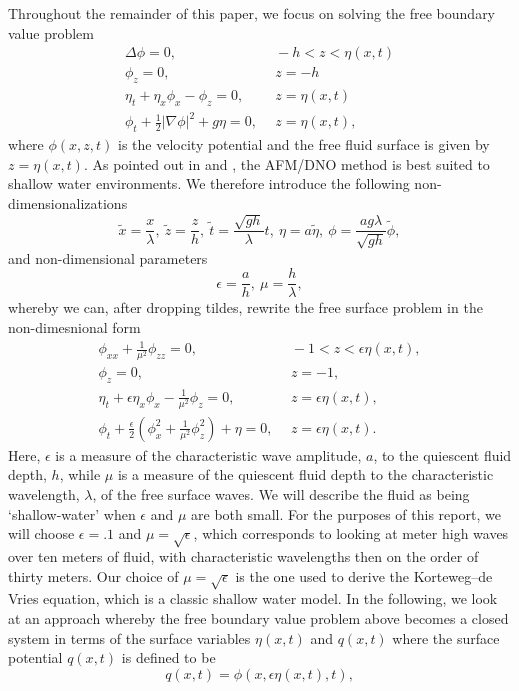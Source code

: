 
Throughout the remainder of this paper, we focus on solving the free boundary value problem 
\begin{align*}
\Delta \phi = 0, & ~~ -h < z < \eta(x,t) \\ 
\phi_{z} = 0, & ~~ z=-h\\
\eta_{t} + \eta_{x}\phi_{x}-\phi_{z} = 0, & ~~ z = \eta(x,t) \\ 
\phi_{t} + \frac{1}{2}\left|\nabla \phi \right|^{2} + g\eta = 0, & ~~ z=\eta(x,t),
\end{align*}
where $\phi(x,z,t)$ is the velocity potential and the free fluid surface is given by $z=\eta(x,t)$.  As pointed out in \cite{yue} and \cite{wilkening}, the AFM/DNO method is best suited to shallow water environments.  We therefore introduce the following non-dimensionalizations
\[
\tilde{x} = \frac{x}{\lambda}, ~ \tilde{z} = \frac{z}{h}, ~ \tilde{t} = \frac{\sqrt{gh}}{\lambda} t , ~ \eta = a \tilde{\eta}, ~ \phi = \frac{ag\lambda}{\sqrt{gh}}\tilde{\phi}, 
\]
and non-dimensional parameters
\[
\epsilon = \frac{a}{h}, ~ \mu = \frac{h}{\lambda}, 
\]
whereby we can, after dropping tildes, rewrite the free surface problem in the non-dimesnional form
\begin{align*}
\phi_{xx} + \frac{1}{\mu^{2} }\phi_{zz} = 0, & ~~ -1 < z < \epsilon\eta(x,t), \\ 
\phi_{z} = 0, & ~~ z=-1,\\
\eta_{t} + \epsilon\eta_{x}\phi_{x}-\frac{1}{\mu^{2}}\phi_{z} = 0, & ~~ z = \epsilon\eta(x,t), \\ 
\phi_{t} + \frac{\epsilon}{2}\left(\phi_{x}^{2} + \frac{1}{\mu^{2}}\phi_{z}^{2}\right) + \eta = 0, & ~~ z=\epsilon\eta(x,t).
\end{align*}
Here, $\epsilon$ is a measure of the characteristic wave amplitude, $a$, to the quiescent fluid depth, $h$, while $\mu$ is a measure of the quiescent fluid depth to the characteristic wavelength, $\lambda$, of the free surface waves.  We will describe the fluid as being `shallow-water' when $\epsilon$ and $\mu$ are both small.  For the purposes of this report, we will choose $\epsilon = .1$ and $\mu = \sqrt{\epsilon}$, which corresponds to looking at meter high waves over ten meters of fluid, with characteristic wavelengths then on the order of thirty meters.  Our choice of $\mu=\sqrt{\epsilon}$ is the one used to derive the Korteweg--de Vries equation, which is a classic shallow water model.  In the following, we look at an approach whereby the free boundary value problem above becomes a closed system in terms of the surface variables $\eta(x,t)$ and $q(x,t)$ where the surface potential $q(x,t)$ is defined to be 
\[
q(x,t) = \phi(x,\epsilon\eta(x,t),t),
\]
